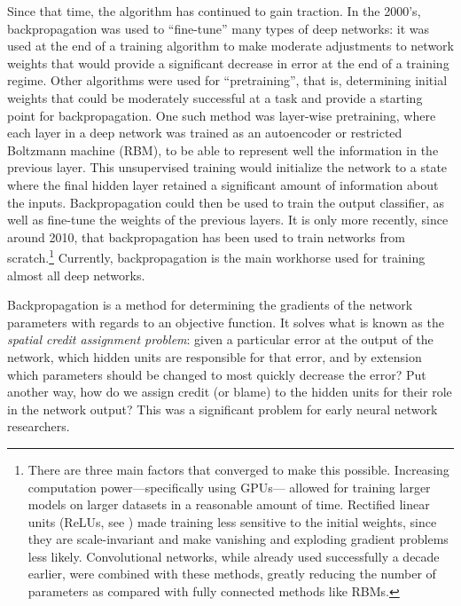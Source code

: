 Since that time, the algorithm has continued to gain traction.
In the 2000's, backpropagation was used to ``fine-tune'' many types of deep networks:
it was used at the end of a training algorithm to make moderate adjustments
to network weights that would provide a significant decrease in error
at the end of a training regime.
Other algorithms were used for ``pretraining'',
that is, determining initial weights that could be moderately successful
at a task and provide a starting point for backpropagation.
One such method was layer-wise pretraining,
where each layer in a deep network was trained as
an autoencoder or restricted Boltzmann machine (RBM),
to be able to represent well the information in the previous layer.
This unsupervised training would initialize the network to a state
where the final hidden layer retained a significant amount of information
about the inputs.
Backpropagation could then be used to train the output classifier,
as well as fine-tune the weights of the previous layers.
It is only more recently, since around 2010,
that backpropagation has been used to train networks from scratch.\footnote{
  There are three main factors that converged to make this possible.
  Increasing computation power---specifically using GPUs---%
  allowed for training larger models on larger datasets in a reasonable
  amount of time.
  Rectified linear units (ReLUs, see )
  made training less sensitive to the initial weights,
  since they are scale-invariant and make
  vanishing and exploding gradient problems less likely.
  Convolutional networks, while already used successfully a decade earlier,
  were combined with these methods,
  greatly reducing the number of parameters as compared with
  fully connected methods like RBMs.}
Currently, backpropagation is the main workhorse used for training almost all deep networks.

Backpropagation is a method for determining
the gradients of the network parameters
with regards to an objective function.
It solves what is known as the \emph{spatial credit assignment problem}:
given a particular error at the output of the network,
which hidden units are responsible for that error,
and by extension which parameters should be changed to most quickly
decrease the error?
Put another way, how do we assign credit (or blame)
to the hidden units for their role in the network output?
This was a significant problem for early neural network researchers.

